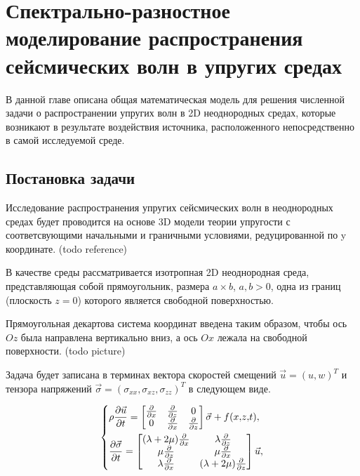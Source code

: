 \section{Спектрально-разностное моделирование распространения сейсмических волн в упругих средах}

В данной главе описана общая математическая модель для решения численной задачи о распространении
упругих волн в 2D неоднородных средах, которые возникают в результате воздействия источника,
расположенного непосредственно в самой исследуемой среде.

\subsection{Постановка задачи}
Исследование распространения упругих сейсмических волн в неоднородных средах будет проводится на 
основе 3D модели теории упругости с соответсвующими начальными и граничными условиями, редуцированной по y координате. (todo reference)

В качестве среды рассматривается изотропная 2D неоднородная среда, представляющая собой прямоугольник, размера $a \times b$, $a, b>0$,
одна из границ (плоскость $z = 0$) которого является свободной поверхностью.

Прямоугольная декартова система координат введена таким образом, чтобы ось $Oz$ была направлена вертикально вниз,
а ось $Ox$ лежала на свободной поверхности. (todo picture)

Задача будет записана в терминах вектора скоростей смещений $\vec{u}={(u, w)}^T$
и тензора напряжений $\vec{\sigma}=(\sigma_{xx}, \sigma_{xz}, \sigma_{zz})^T$ в следующем виде.

\begin{equation}
\label{eq:1}
\begin{dcases}
	\rho\frac{\partial{\vec{u}}}{\partial{t}}
	=\begin{bmatrix}
    \frac{\partial{}}{\partial{x}} & \frac{\partial{}}{\partial{z}} & 0 \\
    0 & \frac{\partial{}}{\partial{x}} & \frac{\partial{}}{\partial{z}}
	\end{bmatrix}
	\vec{\sigma} + f(x{,} z{,} t), \\
	\frac{\partial{\vec{\sigma}}}{\partial{t}}
	=\begin{bmatrix}
    (\lambda+2\mu)\frac{\partial{}}{\partial{x}} & \lambda\frac{\partial{}}{\partial{z}} \\
    \mu\frac{\partial{}}{\partial{z}} & \mu\frac{\partial{}}{\partial{x}} \\
    \lambda\frac{\partial{}}{\partial{x}} & (\lambda+2\mu)\frac{\partial{}}{\partial{z}}
	\end{bmatrix}
	\vec{u},
\end{dcases}
\end{equation}

